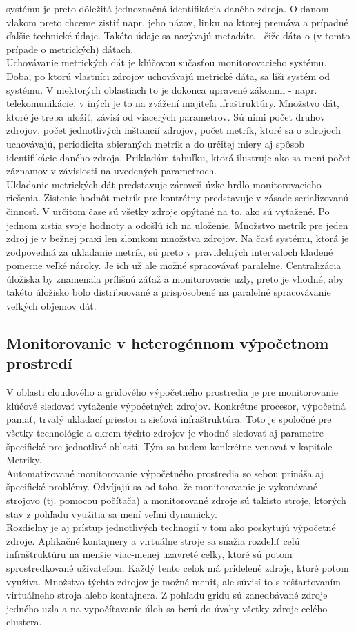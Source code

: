 \documentclass[11pt,final,oneside]{fithesis}
\begin{document}
systému je preto dôležitá jednoznačná identifikácia daného zdroja. O danom vlakom preto chceme zistiť napr. jeho názov, linku na ktorej premáva a prípadné ďalšie technické údaje. Takéto údaje sa nazývajú metadáta - čiže dáta o (v tomto 
prípade o metrických) dátach.
\\Uchovávanie metrických dát je kľúčovou sučasťou monitorovacieho systému. Doba, po ktorú vlastníci zdrojov uchovávajú metrické dáta, sa líši systém od systému. V niektorých oblastiach to je dokonca upravené zákonmi - napr. telekomunikácie,
v iných je to na zvážení majiteľa ifraštruktúry. Množstvo dát, ktoré je treba uložiť, závisí od viacerých parametrov. Sú nimi počet druhov zdrojov, počet jednotlivých inštancií zdrojov, počet metrík, ktoré sa o zdrojoch
uchovávajú, periodicita zbieraných metrík a do určitej miery aj spôsob identifikácie daného zdroja. Prikladám tabuľku, ktorá ilustruje ako sa mení počet záznamov v závislosti na uvedených parametroch.
\\Ukladanie metrických dát predstavuje zároveň úzke hrdlo monitorovacieho riešenia. Zistenie hodnôt metrík pre kontrétny predstavuje v zásade serializovanú činnosť. V určitom čase sú všetky zdroje opýtané na to, ako sú vyťažené. Po jednom
zistia svoje hodnoty a odošlú ich na uloženie. Množstvo metrík pre jeden zdroj je v bežnej praxi len zlomkom množstva zdrojov. Na časť systému, ktorá je zodpovedná za ukladanie metrík, sú preto v pravidelných intervaloch kladené pomerne 
veľké nároky. Je ich už ale možné spracovávať paralelne. Centralizácia úložiska by znamenala prílišnú záťaž a monitorovacie uzly, preto je vhodné, aby takéto úložisko bolo distribuované a prispôsobené na paralelné spracovávanie veľkých
objemov dát.


\subsection{Monitorovanie v heterogénnom výpočetnom prostredí}
V oblasti cloudového a gridového výpočetného prostredia je pre monitorovanie kľúčové sledovať vyťaženie výpočetných zdrojov. Konkrétne procesor, výpočetná pamäť, trvalý ukladací priestor a sieťová infraštruktúra. Toto je spoločné
pre všetky technológie a okrem týchto zdrojov je vhodné sledovať aj parametre špecifické pre jednotlivé oblasti. Tým sa budem konkrétne venovať v kapitole Metriky.
\\Automatizované monitorovanie výpočetného prostredia so sebou prináša aj špecifické problémy. Odvíjajú sa od toho, že monitorovanie je vykonávané strojovo (tj. pomocou počítača) a monitorované zdroje sú takisto stroje, ktorých
stav z pohľadu využitia sa mení veľmi dynamicky.
\\Rozdielny je aj prístup jednotlivých technogií v tom ako poskytujú výpočetné zdroje. Aplikačné kontajnery a virtuálne stroje sa snažia rozdeliť celú infraštruktúru na menšie viac-menej uzavreté celky, ktoré sú potom sprostredkované
užívateľom. Každý tento celok má pridelené zdroje, ktoré potom využíva. Množstvo týchto zdrojov je možné meniť, ale súvisí to s reštartovaním virtuálneho stroja alebo kontajnera. Z pohľadu gridu sú zanedbávané zdroje jedného uzla a na
vypočítavanie úloh sa berú do úvahy všetky zdroje celého clustera. 
\end{document}
